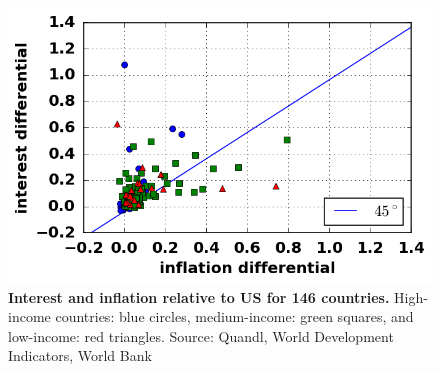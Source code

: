 \begin{figure}[h]
\caption{\label{fig_inflationInterestDifferentialsOpen} \textbf{Interest and inflation relative to US for 146 countries.} High-income countries: blue circles, medium-income: green squares, and low-income: red triangles. {\tiny Source: Quandl, World Development Indicators, World Bank}}
\hspace*{-.5cm}\includegraphics[height = 7.cm]{fig_inflationInterestDifferentialsOpen.png}
\end{figure}